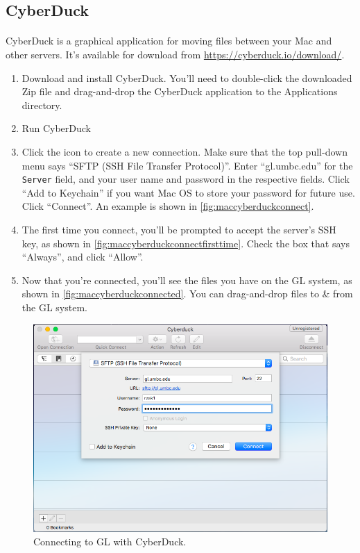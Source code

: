 \documentclass[letter,11pt]{article}
\begin{document}
\FloatBarrier
\subsection{CyberDuck}
\paragraph{}CyberDuck is a graphical application for moving files between your Mac and other servers. It's available for download from \url{https://cyberduck.io/download/}.

\begin{enumerate}
    \item Download and install CyberDuck. You'll need to double-click the downloaded Zip file and drag-and-drop the CyberDuck application to the Applications directory.
    \item Run CyberDuck
    \item Click the icon to create a new connection. Make sure that the top pull-down menu says ``SFTP (SSH File Transfer Protocol)''. Enter ``gl.umbc.edu'' for the \texttt{Server} field, and your user name and password in the respective fields. Click ``Add to Keychain'' if you want Mac OS to store your password for future use. Click ``Connect''. An example is shown in \autoref{fig:maccyberduckconnect}.
    \item The first time you connect, you'll be prompted to accept the server's SSH key, as shown in \autoref{fig:maccyberduckconnectfirsttime}. Check the box that says ``Always'', and click ``Allow''.
    \item Now that you're connected, you'll see the files you have on the GL system, as shown in \autoref{fig:maccyberduckconnected}. You can drag-and-drop files to \& from the GL system.
\end{enumerate}

\begin{figure}
\centering
\includegraphics[scale=0.6]{Images/macos_cyberduck_connect.png}
\caption{Connecting to GL with CyberDuck.}
\label{fig:maccyberduckconnect}
\end{figure}
\end{document}
